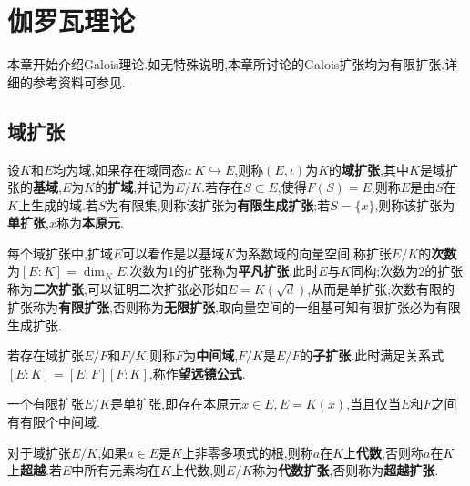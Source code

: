 \chapter{伽罗瓦理论}
本章开始介绍Galois理论.如无特殊说明,本章所讨论的Galois扩张均为有限扩张.详细的参考资料可参见\cite{Patrick}\cite{ZhP}.
\section{域扩张}
\begin{definition}
	设$K$和$E$均为域,如果存在域同态$\iota:K\hookrightarrow E$,则称$(E,\iota)$为$K$的\textbf{域扩张},其中$K$是域扩张的\textbf{基域},$E$为$K$的\textbf{扩域},并记为$E/K$.若存在$S\subset E$,使得$F(S)=E$,则称$E$是由$S$在$K$上生成的域.若$S$为有限集,则称该扩张为\textbf{有限生成扩张};若$S=\{x\}$,则称该扩张为\textbf{单扩张},$x$称为\textbf{本原元}.
\end{definition}
\begin{definition}\label{def:2 ext}
	每个域扩张中,扩域$E$可以看作是以基域$K$为系数域的向量空间,称扩张$E/K$的\textbf{次数}为$[E:K]=\dim_K E$.次数为1的扩张称为\textbf{平凡扩张},此时$E$与$K$同构;次数为2的扩张称为\textbf{二次扩张},可以证明二次扩张必形如$E=K(\sqrt{d})$,从而是单扩张;次数有限的扩张称为\textbf{有限扩张},否则称为\textbf{无限扩张},取向量空间的一组基可知有限扩张必为有限生成扩张.
\end{definition}
\begin{definition}\label{def:telescope}
	若存在域扩张$E/F$和$F/K$,则称$F$为\textbf{中间域},$F/K$是$E/F$的\textbf{子扩张}.此时满足关系式$	[E:K]=[E:F][F:K]$,称作\textbf{望远镜公式}.
\end{definition}
\begin{theorem}[本原元定理]\label{thm:primitive element}
	一个有限扩张$E/K$是单扩张,即存在本原元$x\in E,E=K(x)$,当且仅当$E$和$F$之间有有限个中间域.
\end{theorem}
\begin{definition}
	对于域扩张$E/K$,如果$a\in E$是$K$上非零多项式的根,则称$a$在$K$上\textbf{代数},否则称$a$在$K$上\textbf{超越}.若$E$中所有元素均在$K$上代数,则$E/K$称为\textbf{代数扩张},否则称为\textbf{超越扩张}.
\end{definition}
